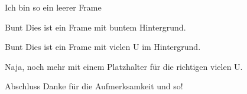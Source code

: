 \documentclass[german,10pt,xcolor=colortbl,compress,aspectratio=169
]{beamer}
\begin{document}
\begin{frame}[plain]{}{}%
	Ich bin so ein leerer Frame
\end{frame}

\begin{frame}[coloredbackground]{Bunt}
	Dies ist ein Frame mit buntem Hintergrund.
\end{frame}

\begin{frame}{Bunt}
	Dies ist ein Frame mit vielen U im Hintergrund.

	Naja, noch mehr mit einem Platzhalter für die richtigen vielen U.
\end{frame}
\begin{frame}{Abschluss}
	Danke für die Aufmerksamkeit und so!
\end{frame}
\end{document}
